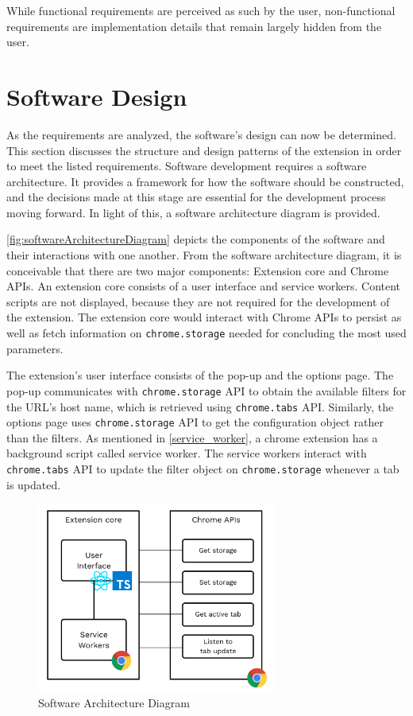 While functional requirements are perceived as such by the user, non-functional requirements are implementation details that remain largely hidden from the user.

\section{Software Design}
As the requirements are analyzed, the software's design can now be determined. This section discusses the structure and design patterns of the extension in order to meet the listed requirements. Software development requires a software architecture. It provides a framework for how the software should be constructed, and the decisions made at this stage are essential for the development process moving forward. In light of this, a software architecture diagram is provided.

\autoref{fig:softwareArchitectureDiagram} depicts the components of the software and their interactions with one another. From the software architecture diagram, it is conceivable that there are two major components: Extension core and Chrome APIs. An extension core consists of a user interface and service workers. Content scripts are not displayed, because they are not required for the development of the extension. The extension core would interact with Chrome APIs to persist as well as fetch information on \texttt{chrome.storage} needed for concluding the most used parameters.

The extension's user interface consists of the pop-up and the options page. The pop-up communicates with \texttt{chrome.storage} API to obtain the available filters for the URL's host name, which is retrieved using \texttt{chrome.tabs} API. Similarly, the options page uses \texttt{chrome.storage} API to get the configuration object rather than the filters. As mentioned in \autoref{service_worker}, a chrome extension has a background script called service worker. The service workers interact with \texttt{chrome.tabs} API to update the filter object on \texttt{chrome.storage} whenever a tab is updated.

\begin{figure}
  \centering
  \includegraphics[width=0.7\textwidth]{assets/software_architecture_diagram.png}
  \caption{Software Architecture Diagram}
  \label{fig:softwareArchitectureDiagram}
\end{figure}


